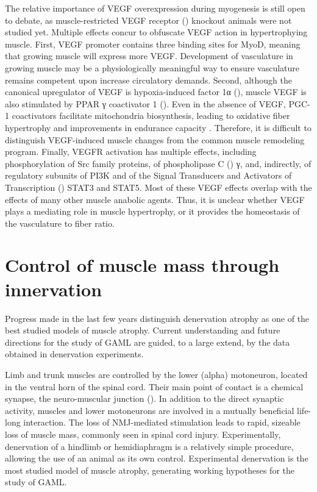 \documentclass[12pt,english]{report}\usepackage[]{graphicx}\usepackage[]{color}
\begin{document}
The relative importance of VEGF overexpression during myogenesis is
still open to debate, as muscle-restricted VEGF receptor ()
knockout animals were not studied yet. Multiple effects concur to
obfuscate VEGF action in hypertrophying muscle. First, VEGF promoter
contains three binding sites for MyoD, meaning that growing muscle
will express more VEGF\citep{bryan2008coordinated}. Development of
vasculature in growing muscle may be a physiologically meaningful
way to ensure vasculature remains competent upon increase circulatory
demands. Second, although the canonical upregulator of VEGF is hypoxia-induced
factor 1α (), muscle
VEGF is also stimulated by PPAR γ coactivator 1 ()\citep{vianna2006hypomorphic,rowe2011pgc-1beta}.
Even in the absence of VEGF, PGC-1 coactivators facilitate mitochondria
biosynthesis, leading to oxidative fiber hypertrophy and improvements
in endurance capacity \citep{lin2002transcriptional}. Therefore,
it is difficult to distinguish VEGF-induced muscle changes from the
common muscle remodeling program. Finally, VEGFR activation has multiple
effects, including phosphorylation of Src family proteins\citep{waltenberger1994different},
of phospholipase C () γ\citep{seetharam1995unique},
and, indirectly, of regulatory subunits of PI3K\citep{gerber1998vascular}
and of the Signal Transducers and Activators of Transcription ()
STAT3 and STAT5\citep{korpelainen1999endothelial}. Most of these
VEGF effects overlap with the effects of many other muscle anabolic
agents. Thus, it is unclear whether VEGF plays a mediating role in
muscle hypertrophy, or it provides the homeostasis of the vasculature
to fiber ratio.


\section{Control of muscle mass through innervation}

Progress made in the last few years distinguish denervation atrophy
as one of the best studied models of muscle atrophy. Current understanding
and future directions for the study of GAML are guided, to a large
extend, by the data obtained in denervation experiments. 

Limb and trunk muscles are controlled by the lower (alpha) motoneuron,
located in the ventral horn of the spinal cord. Their main point of
contact is a chemical synapse, the neuro-muscular junction ().
In addition to the direct synaptic activity, muscles and lower motoneurons
are involved in a mutually beneficial life-long interaction. The loss
of NMJ-mediated stimulation leads to rapid, sizeable loss of muscle
mass, commonly seen in spinal cord injury. Experimentally, denervation
of a hindlimb or hemidiaphragm is a relatively simple procedure, allowing
the use of an animal as its own control. Experimental denervation
is the most studied model of muscle atrophy, generating working hypotheses
for the study of GAML.
\end{document}
